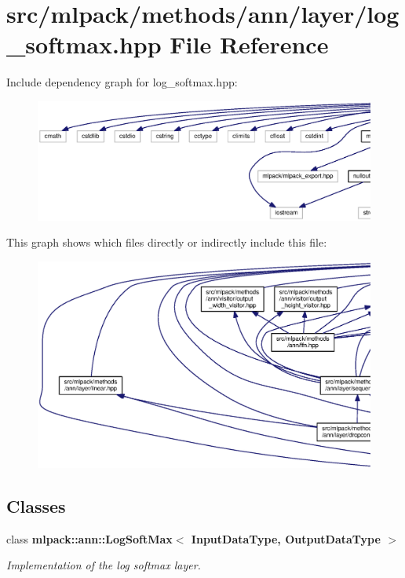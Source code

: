 \section{src/mlpack/methods/ann/layer/log\+\_\+softmax.hpp File Reference}
\label{log__softmax_8hpp}
Include dependency graph for log\+\_\+softmax.\+hpp\+:
\nopagebreak
\begin{figure}[H]
\begin{center}
\leavevmode
\includegraphics[width=350pt]{log__softmax_8hpp__incl}
\end{center}
\end{figure}
This graph shows which files directly or indirectly include this file\+:
\nopagebreak
\begin{figure}[H]
\begin{center}
\leavevmode
\includegraphics[width=350pt]{log__softmax_8hpp__dep__incl}
\end{center}
\end{figure}
\subsection*{Classes}
\begin{DoxyCompactItemize}
\item 
class {\bf mlpack\+::ann\+::\+Log\+Soft\+Max$<$ Input\+Data\+Type, Output\+Data\+Type $>$}
\begin{DoxyCompactList}\small\item\em Implementation of the log softmax layer. \end{DoxyCompactList}\end{DoxyCompactItemize}
